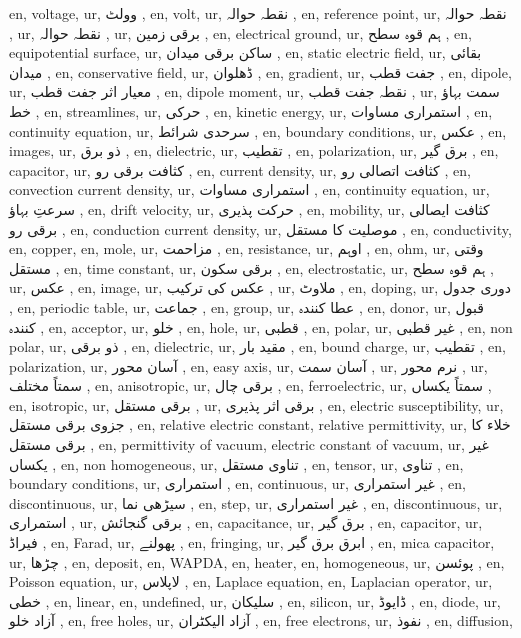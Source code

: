 en, voltage,
ur, وولٹ ,
en, volt,
ur, نقطہ حوالہ ,
en, reference point,
ur, نقطہ حوالہ ,
ur, نقطہ حوالہ ,
ur, برقی زمین ,
en, electrical ground,
ur, ہم قوہ سطح ,
en, equipotential surface,
ur, ساکن برقی میدان ,
en, static electric field,
ur, بقائی میدان ,
en, conservative field,
ur, ڈھلوان ,
en, gradient,
ur, جفت قطب ,
en, dipole,
ur, معیار اثر جفت قطب ,
en, dipole moment,
ur, نقطہ جفت قطب ,
ur, سمت بہاؤ خط ,
en, streamlines,
ur, حرکی ,
en, kinetic energy,
ur, استمراری مساوات ,
en, continuity equation,
ur, سرحدی شرائط ,
en, boundary conditions,
ur, عکس ,
en, images,
ur, ذو برق ,
en, dielectric,
ur, تقطیب ,
en, polarization,
ur, برق گیر ,
en, capacitor,
ur, کثافت برقی رو ,
en, current density,
ur, کثافت اتصالی رو ,
en, convection current density,
ur, استمراری مساوات ,
en, continuity equation,
ur, سرعتِ بہاؤ ,
en, drift velocity,
ur, حرکت پذیری ,
en, mobility,
ur, کثافت ایصالی برقی رو ,
en, conduction current density,
ur, موصلیت کا مستقل ,
en, conductivity,
en, copper,
en, mole,
ur, مزاحمت ,
en, resistance,
ur, اوہم ,
en, ohm,
ur, وقتی مستقل ,
en, time constant,
ur, برقی سکون ,
en, electrostatic,
ur, ہم قوہ سطح ,
ur, عکس ,
en, image,
ur, عکس کی ترکیب ,
ur, ملاوٹ ,
en, doping,
ur, دوری جدول ,
en, periodic table,
ur, جماعت ,
en, group,
ur, عطا کنندہ ,
en, donor,
ur, قبول کنندہ ,
en, acceptor,
ur, خلو ,
en, hole,
ur, قطبی ,
en, polar,
ur, غیر قطبی ,
en, non polar,
ur, ذو برقی ,
en, dielectric,
ur, مقید بار ,
en, bound charge,
ur, تقطیب ,
en, polarization,
ur, آسان محور ,
en, easy axis,
ur, آسان سمت ,
ur, نرم محور ,
ur, سمتاً مختلف ,
en, anisotropic,
ur, برقی چال ,
en, ferroelectric,
ur, سمتاً یکساں ,
en, isotropic,
ur, برقی مستقل ,
ur, برقی اثر پذیری ,
en, electric susceptibility,
ur, جزوی برقی مستقل ,
en, relative electric constant, relative permittivity,
ur, خلاء کا برقی مستقل ,
en, permittivity of vacuum, electric constant of vacuum,
ur, غیر یکساں ,
en, non homogeneous,
ur, تناوی مستقل ,
en, tensor,
ur, تناوی ,
en, boundary conditions,
ur, استمراری ,
en, continuous,
ur, غیر استمراری ,
en, discontinuous,
ur, سیڑھی نما ,
en, step,
ur, غیر استمراری ,
en, discontinuous,
ur, استمراری ,
ur, برقی گنجائش ,
en, capacitance,
ur, برق گیر ,
en, capacitor,
ur, فیراڈ ,
en, Farad,
ur, پھولنے ,
en, fringing,
ur, ابرق برق گیر ,
en, mica capacitor,
ur, چڑھا ,
en, deposit,
en, WAPDA,
en, heater,
en, homogeneous,
ur, پوئسن ,
en, Poisson equation,
ur, لاپلاس ,
en, Laplace equation,
en, Laplacian operator,
ur, خطی ,
en, linear,
en, undefined,
ur, سلیکان ,
en, silicon,
ur, ڈایوڈ ,
en, diode,
ur, آزاد خلو ,
en, free holes,
ur, آزاد الیکٹران ,
en, free electrons,
ur, نفوذ ,
en, diffusion,
